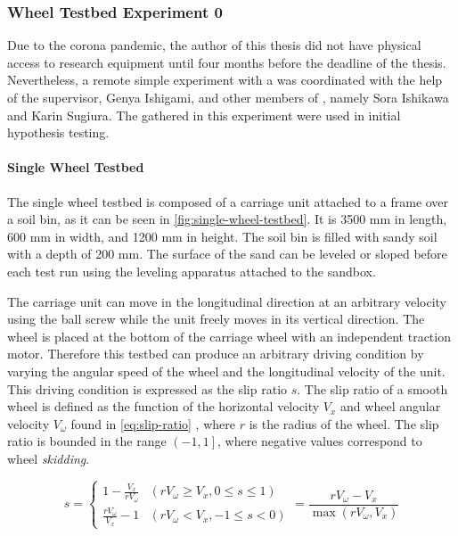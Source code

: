 \subsubsection{Wheel Testbed Experiment 0}
\label{subsec:wheel-testbed-experiment-0}
Due to the corona pandemic, the author of this thesis did not have physical
access to research equipment until four months before the deadline of the
thesis. Nevertheless, a remote simple experiment with a
 was coordinated with the help of the
supervisor, Genya Ishigami, and other members of \SRG, namely Sora Ishikawa and
Karin Sugiura. The  gathered in this
experiment were used in initial hypothesis testing.

\paragraph{Single Wheel Testbed}
\label{para:single-wheel-testbed}
The single wheel testbed is composed of a carriage unit attached to a frame
over a soil bin, as it can be seen in \cref{fig:single-wheel-testbed}. It is
3500 mm in length, 600 mm in width, and 1200 mm in height. The soil bin is
filled with sandy soil with a depth of 200 mm. The surface of the sand can be
leveled or sloped before each test run using the leveling apparatus attached to
the sandbox.


The carriage unit can move in the longitudinal direction at an arbitrary
velocity using the ball screw while the unit freely moves in its vertical
direction. The wheel is placed at the bottom of the carriage wheel with an
independent traction motor. Therefore this testbed can produce an arbitrary
driving condition by varying the angular speed of the wheel and the
longitudinal velocity of the unit. This driving condition is expressed as the
slip ratio $s$. The slip ratio of a smooth wheel is defined as the function of
the horizontal velocity $V_x$ and wheel angular velocity $V_\omega$ found in
\cref{eq:slip-ratio} \cite{Slip2009}, where $r$ is the radius of the wheel. The
slip ratio is bounded in the range $\left(-1,1\right]$, where negative values
correspond to wheel \emph{skidding}.

\begin{equation}
    s = \begin{cases} 
        1 - \frac{V_x}{r V_\omega} & (r V_\omega \geq V_x, 0 \leq s \leq 1) \\
        \frac{r V_\omega}{V_x} - 1 & (r V_\omega < V_x, -1 \leq s < 0)
    \end{cases} = \frac{r V_\omega - V_x}{\max(r V_\omega, V_x)}
    \label{eq:slip-ratio}
\end{equation}

